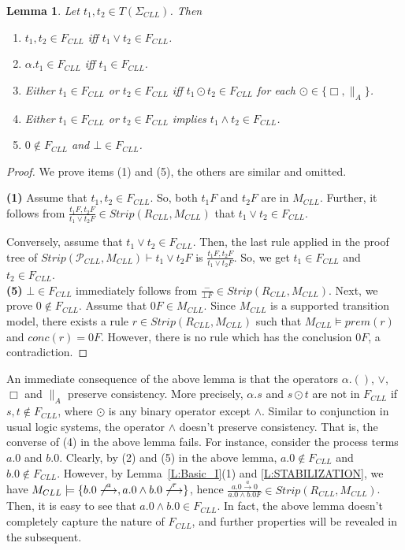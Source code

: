 \documentclass{elsarticle}
\theoremstyle{plain}
\newtheorem{lemma}[theorem]{Lemma}
\theoremstyle{definition}
\begin{document}
\begin{lemma}\label{L:F_NORMAL}
  Let $t_1,t_2\in T(\Sigma_{CLL})$. Then
  \begin{enumerate}
    \item  $t_1,t_2 \in F_{CLL}$ iff $t_1 \vee t_2 \in F_{CLL}$.
    \item $\alpha.t_1 \in F_{CLL}$ iff $t_1 \in F_{CLL}$.
    \item Either $t_1 \in F_{CLL}$ or $t_2 \in F_{CLL}$ iff $t_1 \odot t_2 \in F_{CLL}$  for each $\odot \in \{\Box, \parallel_A\}$.
    \item Either $t_1 \in F_{CLL}$ or $t_2 \in F_{CLL}$ implies $t_1 \wedge t_2 \in F_{CLL}$.
    \item $0 \notin F_{{CLL}}$ and $\bot \in F_{CLL}$.
  \end{enumerate}
\end{lemma}
\begin{proof}
We prove items (1) and (5), the others are similar and omitted.

\noindent \textbf{(1)} Assume that $t_1,t_2 \in F_{CLL}$. So, both $t_1 F$ and $t_2 F$ are in $M_{CLL}$. Further, it follows from $ \frac{t_1F,t_2F}{t_1 \vee t_2 F}\in Strip(R_{CLL},M_{CLL})$ that $t_1 \vee t_2 \in F_{CLL}$.

Conversely, assume that $t_1 \vee t_2 \in F_{CLL}$. Then, the last rule applied in the proof tree of $Strip({\mathcal P}_{CLL},M_{CLL}) \vdash t_1 \vee t_2F$ is $ \frac{t_1F,t_2F}{t_1 \vee t_2 F}$. So, we get $t_1 \in F_{CLL}$ and $t_2  \in F_{CLL}$.\\

\noindent \textbf{(5)} $\bot \in F_{CLL}$ immediately follows from $ \frac{-}{\bot F}\in Strip(R_{CLL},M_{CLL}) $. Next, we prove $0 \notin F_{CLL}$. Assume that $0F \in M_{{CLL}}$. Since $M_{{CLL}}$ is a supported transition model, there exists a rule $r \in Strip(R_{CLL},M_{CLL})$ such that $M_{{CLL}} \models prem(r)$ and $conc(r)=0F$. However, there is no rule which has the conclusion $0F$, a contradiction.
\end{proof}

An immediate consequence of the above lemma is that the operators $\alpha.()$, $\vee$, $\Box$ and $\parallel_A$ preserve consistency. More precisely, $\alpha.s$ and $s \odot t$ are not in $F_{CLL}$ if $s,t\notin F_{CLL}$, where $\odot$ is any binary operator except $\wedge$. Similar to conjunction in usual logic systems, the operator $\wedge$ doesn't preserve consistency. That is, the converse of (4) in the above lemma fails. For instance, consider the process terms $a.0$ and $b.0$. Clearly, by (2) and (5) in the above lemma, $a.0 \notin F_{CLL}$ and $b.0 \notin F_{CLL}$.
However, by Lemma~\ref{L:Basic_I}(1) and \ref{L:STABILIZATION}, we have $M_{CLL} \models \{b.0 \not\stackrel{a}{\longrightarrow}, a.0\wedge b.0 \not\stackrel{\tau}{\longrightarrow}\}$, hence $\frac{a.0 \stackrel{a}{\longrightarrow}0}{a.0 \wedge b.0 F} \in Strip(R_{CLL},M_{CLL})$.
Then, it is easy to see that $a.0\wedge b.0 \in F_{CLL}$.
In fact, the above lemma doesn't completely capture the nature of $F_{CLL}$, and further properties will be revealed in the subsequent.
\end{document}
